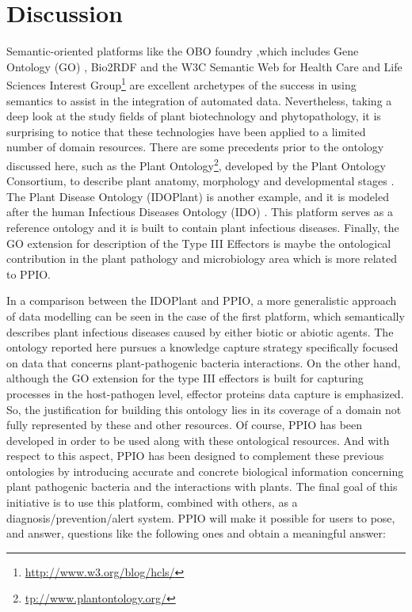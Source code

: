 \documentclass[sw]{iosart2c}
\newcommand{\myurl}[1]{\footnote{\url{#1}}}
\begin{document}
\section{Discussion}\label{sec:discussion}

Semantic-oriented platforms like the OBO foundry \cite{Smith},which includes Gene Ontology (GO) \cite{Gene}, Bio2RDF \cite{RDF} and the W3C Semantic  Web  for Health  Care  and  Life Sciences Interest Group\myurl{http://www.w3.org/blog/hcls/} are excellent archetypes of the success in using semantics to assist in the integration of automated data. Nevertheless, taking a deep look at the study fields of plant biotechnology and phytopathology, it is surprising to notice that these technologies have been applied to a limited number of domain resources. There are some precedents prior to the ontology discussed here, such as the Plant Ontology\myurl{tp://www.plantontology.org/}, developed by the Plant Ontology Consortium, to describe plant anatomy, morphology and developmental stages \cite{PO}. The Plant Disease Ontology (IDOPlant) \cite{Walls} is another example, and it is modeled after the human Infectious Diseases Ontology (IDO) \cite{IDO}. This platform serves as a reference ontology and it is built to contain plant infectious diseases. Finally, the GO extension for description of the Type III Effectors \cite{Lindeberg} is maybe the ontological contribution in the plant pathology and microbiology area which is more related to PPIO.

In a comparison between the IDOPlant and PPIO, a more generalistic approach of data modelling can be seen in the case of the first platform, which semantically describes plant infectious diseases caused by either biotic or abiotic agents. The ontology reported here pursues a knowledge capture strategy specifically focused on data that concerns plant-pathogenic bacteria interactions. On the other hand, although the GO extension for the type III effectors is built for capturing processes in the host-pathogen level, effector proteins data capture is emphasized. So, the justification for building this ontology lies in its coverage of a domain not fully represented by these and other resources. Of course, PPIO has been developed in order to be used along with these ontological resources. And with respect to this aspect, PPIO has been designed to complement these previous ontologies by introducing accurate and concrete biological information concerning plant pathogenic bacteria and the interactions with plants. The final goal of this initiative is to use this platform, combined with others, as a diagnosis/prevention/alert system. PPIO will make it possible for users to pose, and answer, questions like the following ones and obtain a meaningful answer:
\end{document}
